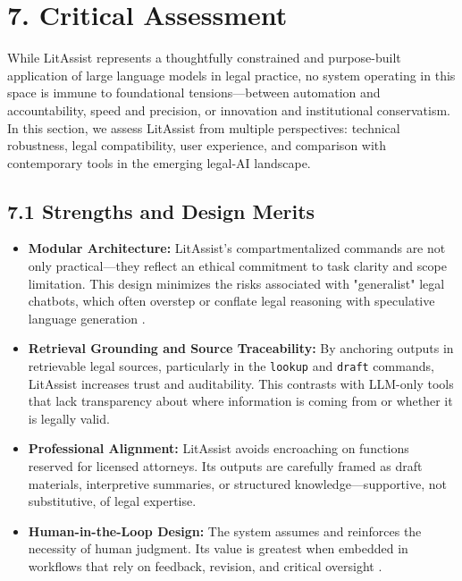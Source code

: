 \documentclass[12pt,a4paper]{article}
\begin{document}
\section*{7. Critical Assessment}

While LitAssist represents a thoughtfully constrained and purpose-built application of large language models in legal practice, no system operating in this space is immune to foundational tensions—between automation and accountability, speed and precision, or innovation and institutional conservatism. In this section, we assess LitAssist from multiple perspectives: technical robustness, legal compatibility, user experience, and comparison with contemporary tools in the emerging legal-AI landscape.

\subsection*{7.1 Strengths and Design Merits}

\begin{itemize}
\item \textbf{Modular Architecture:} LitAssist's compartmentalized commands are not only practical—they reflect an ethical commitment to task clarity and scope limitation. This design minimizes the risks associated with "generalist" legal chatbots, which often overstep or conflate legal reasoning with speculative language generation \cite{Bommarito2022}.

\item \textbf{Retrieval Grounding and Source Traceability:} By anchoring outputs in retrievable legal sources, particularly in the \texttt{lookup} and \texttt{draft} commands, LitAssist increases trust and auditability. This contrasts with LLM-only tools that lack transparency about where information is coming from or whether it is legally valid.

\item \textbf{Professional Alignment:} LitAssist avoids encroaching on functions reserved for licensed attorneys. Its outputs are carefully framed as draft materials, interpretive summaries, or structured knowledge—supportive, not substitutive, of legal expertise.

\item \textbf{Human-in-the-Loop Design:} The system assumes and reinforces the necessity of human judgment. Its value is greatest when embedded in workflows that rely on feedback, revision, and critical oversight \cite{Winfield2021}.
\end{itemize}
\end{document}
